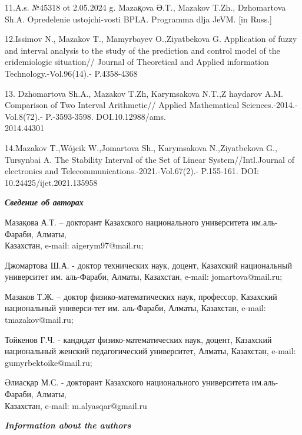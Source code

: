 \begin{noparindent}
11.A.s. №45318 ot 2.05.2024 g. Mazaқova Ә.T., Mazakov T.Zh., Dzhomartova
Sh.A. Opredelenie ustojchi-vosti BPLA. Programma dlja JeVM. {[}in
Russ.{]}

12.Issimov N., Mazakov T., Mamyrbayev O.,Ziyatbekova G. Application of
fuzzy and interval analysis to the study of the prediction and control
model of the eridemiologic situation// Journal of Theoretical and
Applied information Technology.-Vol.96(14).- P.4358-4368

13. Dzhomartova Sh.A., Mazakov T.Zh, Karymsakova N.T.,Z haydarov A.M.
Comparison of Two Interval Arithmetic// Applied Mathematical
Sciences.-2014.-Vol.8(72).- P.-3593-3598. DOI.10.12988/ams.\\2014.44301

14.Mazakov T.,Wójcik W.,Jomartova Sh., Karymsakova N.,Ziyatbekova G.,
Tursynbai A. The Stability Interval of the Set of Linear
System//Intl.Journal of electronics and
Telecommunications.-2021.-Vol.67(2).- P.155-161. DOI:
10.24425/ijet.2021.135958
\end{noparindent}


\emph{{\bfseries Сведение об авторах}}
\begin{noparindent}

Мазақова А.Т. -- докторант Казахского национального университета
им.аль-Фараби, Алматы,\\ Казахстан, e-mail: aigerym97@mail.ru;

Джомартова Ш.А. - доктор технических наук, доцент, Казахский
национальный университет им. аль-Фараби, Алматы, Казахстан, e-mail:
jomartova@mail.ru;

Мазаков Т.Ж. -- доктор физико-математических наук, профессор, Казахский
национальный универси-тет им. аль-Фараби, Алматы, Казахстан, e-mail:
tmazakov@mail.ru;

Тойкенов Г.Ч. - кандидат физико-математических наук, доцент, Казахский
национальный женский педагогический университет, Алматы, Казахстан,
e-mail: gumyrbektoike@mail.ru;

Әлиасқар М.С. - докторант Казахского национального университета
им.аль-Фараби, Алматы, \\Казахстан, e-mail: m.alyasqar@gmail.ru
\end{noparindent}
 
\emph{{\bfseries Information about the authors}}



